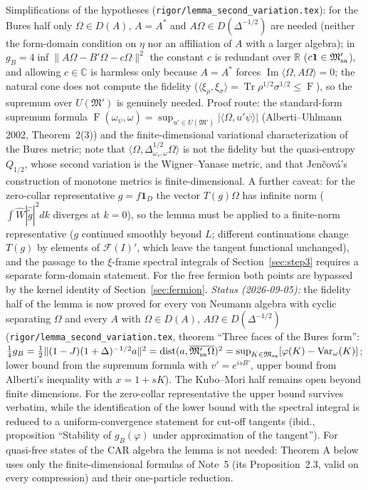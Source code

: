 \documentclass[11pt]{article}
\theoremstyle{accent}
\theoremstyle{definition}
\newcommand{\cF}{\mathcal{F}}
\newcommand{\cM}{\mathfrak{M}}
\newcommand{\Tr}{\operatorname{Tr}}
\newcommand{\Fid}{\operatorname{F}}
\begin{document}
Simplifications of the hypotheses (\texttt{rigor/lemma\_second\_variation.tex}): for the Bures half only \(\Omega\in D(A)\), \(A=A^*\) and \(A\Omega\in D(\Delta^{-1/2})\) are needed (neither the form-domain condition on \(\eta\) nor an affiliation of \(A\) with a larger algebra); in \(g_B=4\inf\|A\Omega-B'\Omega-c\Omega\|^2\) the constant \(c\) is redundant over \(\mathbb R\) (\(c\mathbf 1\in\cM'_{\rm sa}\)), and allowing \(c\in\mathbb C\) is harmless only because \(A=A^*\) forces \(\operatorname{Im}\langle\Omega,A\Omega\rangle=0\); the natural cone does not compute the fidelity (\(\langle\xi_\rho,\xi_\sigma\rangle=\Tr\rho^{1/2}\sigma^{1/2}\le\Fid\)), so the supremum over \(U(\cM')\) is genuinely needed.  Proof route: the standard-form supremum formula \(\Fid(\omega_\psi,\omega)=\sup_{u'\in U(\cM')}|\langle\Omega,u'\psi\rangle|\) (Alberti--Uhlmann 2002, Theorem~2(3)) and the finite-dimensional variational characterization of the Bures metric; note that \(\langle\Omega,\Delta_{\omega_s,\omega}^{1/2}\Omega\rangle\) is not the fidelity but the quasi-entropy \(Q_{1/2}\), whose second variation is the Wigner--Yanase metric, and that Jen\v cov\'a's construction of monotone metrics is finite-dimensional.  A further caveat: for the zero-collar representative \(g=f\mathbf 1_D\) the vector \(T(g)\Omega\) has infinite norm (\(\int\widehat W|\widehat{\widetilde g}|^2dk\) diverges at \(k=0\)), so the lemma must be applied to a finite-norm representative (\(g\) continued smoothly beyond \(L\); different continuations change \(T(g)\) by elements of \(\cF(I)'\), which leave the tangent functional unchanged), and the passage to the \(\xi\)-frame spectral integrals of Section~\ref{sec:step3} requires a separate form-domain statement.  For the free fermion both points are bypassed by the kernel identity of Section~\ref{sec:fermion}.  \emph{Status (2026-09-05):} the fidelity half of the lemma is now proved for every von Neumann algebra with cyclic separating \(\Omega\) and every \(A\) with \(\Omega\in D(A)\), \(A\Omega\in D(\Delta^{-1/2})\) (\texttt{rigor/lemma\_second\_variation.tex}, theorem ``Three faces of the Bures form'': \(\tfrac14g_B=\tfrac12\|(1-J)(1+\Delta)^{-1/2}a\|^2=\operatorname{dist}(a,\overline{\cM'_{\rm sa}\Omega})^2=\sup_{K\in\cM_{\rm sa}}[\varphi(K)-\operatorname{Var}_\omega(K)]\); lower bound from the supremum formula with \(v'=e^{isB'}\), upper bound from Alberti's inequality with \(x=1+sK\)).  The Kubo--Mori half remains open beyond finite dimensions.  For the zero-collar representative the upper bound survives verbatim, while the identification of the lower bound with the spectral integral is reduced to a uniform-convergence statement for cut-off tangents (ibid., proposition ``Stability of \(g_B(\varphi)\) under approximation of the tangent'').  For quasi-free states of the CAR algebra the lemma is not needed: Theorem A below uses only the finite-dimensional formulas of Note~5 (its Proposition~2.3, valid on every compression) and their one-particle reduction.
\end{document}
